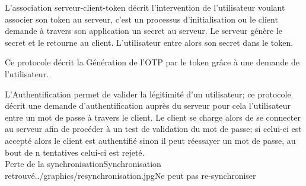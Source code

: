 \documentclass{"../../res/univ-projet"}
\begin{document}
\clearpage


\vspace{0.5cm}


L'association serveur-client-token décrit l'intervention de l'utilisateur voulant associer son token au serveur, c'est un processus d'initialisation ou le client
demande à travers son application un secret au serveur. Le serveur génère le secret et le retourne au client. L'utilisateur entre alors son secret dans le token.

\vspace{1cm}



\vspace{0.5cm}


Ce protocole décrit la Génération de l'OTP par le token grâce à une demande de l'utilisateur.
\\

\vspace{0.5cm}


L'Authentification permet de valider la légitimité d'un utilisateur; ce protocole décrit une demande d'authentification auprès du serveur pour cela l'utilisateur
entre un mot de passe à travers le client. Le client se charge alors de se connecter au serveur afin de procéder à un test de validation du mot de passe; si celui-ci
est accepté alors le client est authentifié sinon il peut réessayer un mot de passe, au bout de n tentatives celui-ci est rejeté.
\\
{Perte de la synchronisation}{Synchronisation retrouvé}{../graphics/resynchronisation.jpg}{Ne peut pas re-synchroniser}

\vspace{0.5cm}
\end{document}
